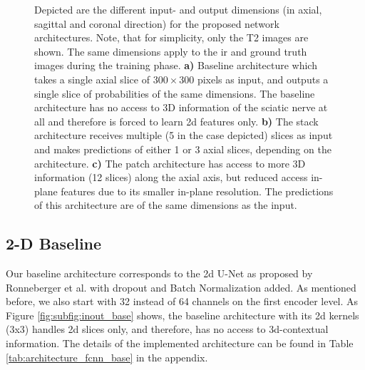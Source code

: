 \begin{figure}[htbp]
	\centering
	\hfill
    \hfill
	\caption[Inputs and Outputs of the Architectures]{Depicted are the different input- and output dimensions (in axial, sagittal and coronal direction) for the proposed network architectures. Note, that for simplicity, only the T2 images are shown. The same dimensions apply to the \gls{ir} and ground truth images during the training phase. \textbf{a)} Baseline architecture which takes a single axial slice of $300 \times 300$ pixels as input, and outputs a single slice of probabilities of the same dimensions. The baseline architecture has no access to 3D information of the sciatic nerve at all and therefore is forced to learn \gls{2d} features only. \textbf{b)} The stack architecture receives multiple (5 in the case depicted) slices as input and makes predictions of either 1 or 3 axial slices, depending on the architecture. \textbf{c)} The patch architecture has access to more 3D information (12 slices) along the axial axis, but reduced access in-plane features due to its smaller in-plane resolution. The predictions of this architecture are of the same dimensions as the input.}
	\label{fig:inout}  
\end{figure}

\subsection{2-D Baseline}
Our baseline architecture corresponds to the \gls{2d} U-Net as proposed by Ronneberger et al. \cite{Ronneberger2015U-Net:Segmentation} with dropout and Batch Normalization added. As mentioned before, we also start with 32 instead of 64 channels on the first encoder level. As Figure \ref{fig:subfig:inout_base} shows, the baseline architecture with its \gls{2d} kernels (3x3) handles \gls{2d} slices only, and therefore, has no access to \gls{3d}-contextual information. The details of the implemented architecture can be found in Table \ref{tab:architecture_fcnn_base} in the appendix.

